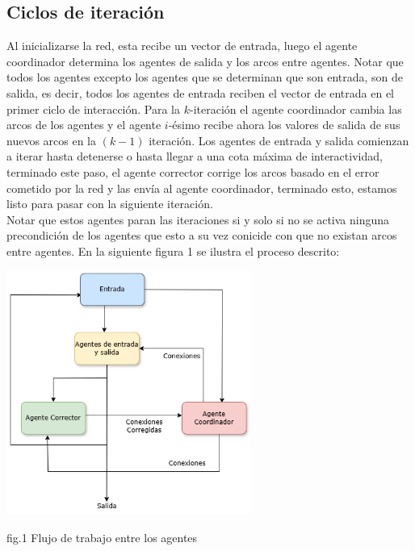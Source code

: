         \subsection*{Ciclos de iteración}

         Al inicializarse la red, esta recibe un vector de entrada, luego el agente coordinador determina los agentes de salida y los arcos entre agentes. Notar que todos los agentes excepto los agentes que se determinan que son entrada, son de salida, es decir, todos los agentes de entrada reciben el vector de entrada en el primer ciclo de interacción. Para la $k$-iteración el agente coordinador cambia las arcos de los agentes y el agente $i$-ésimo recibe ahora los valores de salida de sus nuevos arcos en la $(k-1)$ iteración. Los agentes de entrada y salida comienzan a iterar hasta detenerse o hasta llegar a una cota máxima de interactividad, terminado este paso, el agente corrector corrige los arcos basado en el error cometido por la red y las envía al agente coordinador, terminado esto, estamos listo para pasar con la siguiente iteración. \\

        Notar que estos agentes paran las iteraciones si y solo si no se activa ninguna precondición de los agentes que esto a su vez conicide con que no existan arcos entre agentes. En la siguiente figura 1 se ilustra el proceso descrito: \\


        \begin{center}
                \includegraphics[width=0.6\textwidth]{images/AgentArchitecture.drawio.png}
                \begin{center}
                    fig.1 Flujo de trabajo entre los agentes
                \end{center}
        \end{center}